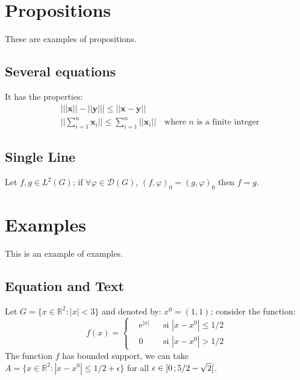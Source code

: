 \section{Propositions}

These are examples of propositions.

\subsection{Several equations}


\begin{proposition}
It has the properties:
\begin{align}
& \big| ||\mathbf{x}|| - ||\mathbf{y}|| \big|\leq || \mathbf{x}- \mathbf{y}||\\
&  ||\sum_{i=1}^n\mathbf{x}_i||\leq \sum_{i=1}^n||\mathbf{x}_i||\quad\text{where $n$ is a finite integer}
\end{align}
\end{proposition}

\subsection{Single Line}

\begin{proposition} 
Let $f,g\in L^2(G)$; if $\forall \varphi\in\mathcal{D}(G)$, $(f,\varphi)_0=(g,\varphi)_0$ then $f = g$. 
\end{proposition}


\section{Examples}

This is an example of examples.

\subsection{Equation and Text}

\begin{example}
Let $G=\{x\in\mathbb{R}^2:|x|<3\}$ and denoted by: $x^0=(1,1)$; consider the function:
\begin{equation}
f(x)=\left\{\begin{aligned} & \mathrm{e}^{|x|} & & \text{si $|x-x^0|\leq 1/2$}\\
& 0 & & \text{si $|x-x^0|> 1/2$}\end{aligned}\right.
\end{equation}
The function $f$ has bounded support, we can take $A=\{x\in\mathbb{R}^2:|x-x^0|\leq 1/2+\epsilon\}$ for all $\epsilon\in\mathopen{]}0\,;5/2-\sqrt{2}\mathclose{[}$.
\end{example}

